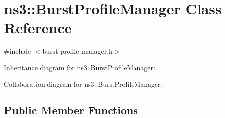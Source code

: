 \hypertarget{classns3_1_1BurstProfileManager}{}\section{ns3\+:\+:Burst\+Profile\+Manager Class Reference}
\label{classns3_1_1BurstProfileManager}


{\ttfamily \#include $<$burst-\/profile-\/manager.\+h$>$}



Inheritance diagram for ns3\+:\+:Burst\+Profile\+Manager\+:


Collaboration diagram for ns3\+:\+:Burst\+Profile\+Manager\+:
\subsection*{Public Member Functions}
